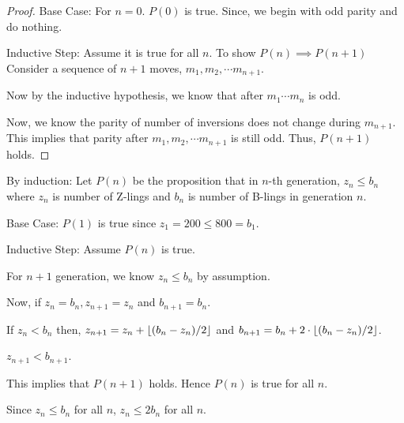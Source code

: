 \documentclass[titlepage,12pt]{book}
\begin{document}
\begin{solution}
{\begin{proof}
            Base Case: For $n=0$. $P(0)$ is true. Since, we begin with odd parity and do nothing.

            Inductive Step: Assume it is true for all $n$. To show $P(n) \implies P(n + 1)$
            Consider a sequence of $n + 1$ moves, $m_{1}, m_{2}, \cdots m_{n + 1}$.

            Now by the inductive hypothesis, we know that
            after $m_{1} \cdots m_{n}$ is odd.

            Now, we know the parity of number of inversions does not change during
            $m_{n + 1}$. This implies that parity after $m_{1}, m_{2}, \cdots m_{n + 1}$
            is still odd. Thus, $P(n + 1)$ holds.
        \end{proof}

    }
\end{solution}


\begin{solution}
    By induction:
    Let $P(n)$ be the proposition that in $n$-th generation,
    $z_{n} \leq b_{n}$ where $z_{n}$ is number of Z-lings and $b_{n}$ is number of B-lings in generation $n$.

    Base Case: $P(1)$ is true since $z_{1} = 200 \leq 800 = b_{1}$.
    
    Inductive Step: Assume $P(n)$ is true.
    
    For $n + 1$ generation, we know $z_{n} \leq b_{n}$ by assumption.

    Now, if $z_{n} = b_{n}, z_{n + 1} = z_{n}$ and $b_{n + 1} = b_{n}$.

    If $z_{n} < b_{n}$ then,
    $z_{n + 1} = z_{n} + \lfloor(b_{n} - z_{n}) / 2\rfloor$
    and
    $b_{n + 1} = b_{n} + 2 \cdot \lfloor(b_{n} - z_{n}) / 2\rfloor$.

    $z_{n + 1} < b_{n + 1}$.

    This implies that $P(n + 1)$ holds.
    Hence $P(n)$ is true for all $n$.

    Since $z_{n} \leq b_{n}$ for all $n$, $z_{n} \leq 2b_{n}$ for all $n$.
\end{solution}
\end{document}
